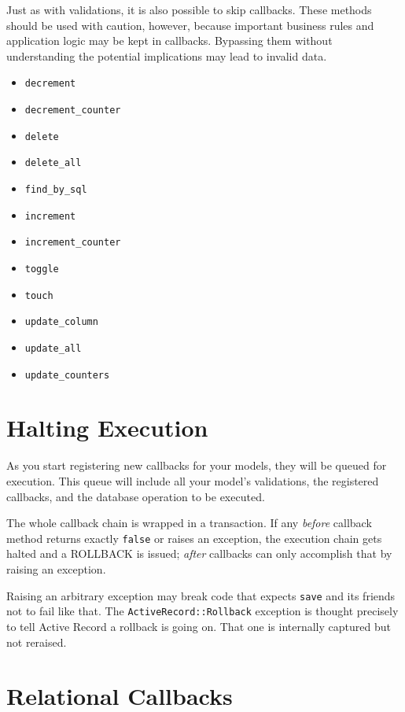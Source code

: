 \documentclass[10pt]{book}
\begin{document}
Just as with validations, it is also possible to skip callbacks.  These methods should be used with caution, however, because important  business rules and application logic may be kept in callbacks. Bypassing  them without understanding the potential implications may lead to  invalid data.
\begin{itemize}
	\item \texttt{decrement}
	\item \texttt{decrement\_counter}
	\item \texttt{delete}
	\item \texttt{delete\_all}
	\item \texttt{find\_by\_sql}
	\item \texttt{increment}
	\item \texttt{increment\_counter}
	\item \texttt{toggle}
	\item \texttt{touch}
	\item \texttt{update\_column}
	\item \texttt{update\_all}
	\item \texttt{update\_counters}
\end{itemize}

\section{ Halting Execution}

As you start registering new callbacks for your models, they will be  queued for execution. This queue will include all your model’s  validations, the registered callbacks, and the database operation to be  executed.

The whole callback chain is wrapped in a transaction. If any \emph{before} callback method returns exactly \texttt{false} or raises an exception, the execution chain gets halted and a ROLLBACK is issued; \emph{after} callbacks can only accomplish that by raising an exception.

Raising an arbitrary exception may break code that expects \texttt{save} and its friends not to fail like that. The \texttt{ActiveRecord::Rollback} exception is thought precisely to tell Active Record a rollback is going on. That one is internally captured but not reraised.

\section{ Relational Callbacks}
\end{document}
